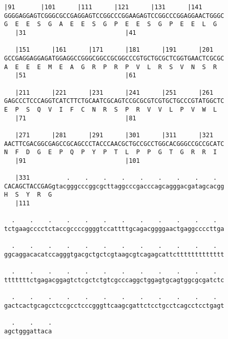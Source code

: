\documentclass{article}
\begin{document}
\newpage
\begin{Verbatim}[fontfamily=courier]
   |91       |101      |111      |121      |131      |141   
GGGGAGGAGTCGGGCGCCGAGGAGTCCGGCCCGGAAGAGTCCGGCCCGGAGGAACTGGGC
G  E  E  S  G  A  E  E  S  G  P  E  E  S  G  P  E  E  L  G  
   |31                           |41                        

   |151      |161      |171      |181      |191      |201   
GCCGAGGAGGAGATGGAGGCCGGGCGGCCGCGGCCCGTGCTGCGCTCGGTGAACTCGCGC
A  E  E  E  M  E  A  G  R  P  R  P  V  L  R  S  V  N  S  R  
   |51                           |61                        

   |211      |221      |231      |241      |251      |261   
GAGCCCTCCCAGGTCATCTTCTGCAATCGCAGTCCGCGCGTCGTGCTGCCCGTATGGCTC
E  P  S  Q  V  I  F  C  N  R  S  P  R  V  V  L  P  V  W  L  
   |71                           |81                        

   |271      |281      |291      |301      |311      |321   
AACTTCGACGGCGAGCCGCAGCCCTACCCAACGCTGCCGCCTGGCACGGGCCGCCGCATC
N  F  D  G  E  P  Q  P  Y  P  T  L  P  P  G  T  G  R  R  I  
   |91                           |101                       

   |331          .    .    .    .    .    .    .    .    .  
CACAGCTACCGAGgtacgggcccggcgcttaggcccgacccagcagggacgatagcacgg
H  S  Y  R  G                                               
   |111                                                     

  .    .    .    .    .    .    .    .    .    .    .    .  
tctgaagcccctctaccgccccggggtccattttgcagacggggaactgaggccccttga

  .    .    .    .    .    .    .    .    .    .    .    .  
ggcaggacacatccagggtgacgctgctcgtaagcgtcagagcattcttttttttttttt

  .    .    .    .    .    .    .    .    .    .    .    .  
tttttttctgagacggagtctcgctctgtcgcccaggctggagtgcagtggcgcgatctc

  .    .    .    .    .    .    .    .    .    .    .    .  
gactcactgcagcctccgcctcccgggttcaagcgattctcctgcctcagcctcctgagt

  .    .    .
agctgggattaca
\end{Verbatim}
\newpage
\end{document}
